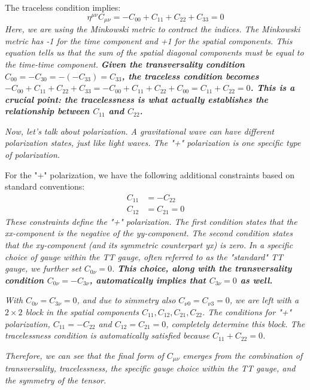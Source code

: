 The traceless condition implies:
\begin{equation}
\eta^{\mu \nu} C_{\mu \nu} = -C_{00} + C_{11} + C_{22} + C_{33} = 0
\end{equation}
\emph{Here, we are using the Minkowski metric to contract the indices. The Minkowski metric has -1 for the time component and +1 for the spatial components. This equation tells us that the sum of the spatial diagonal components must be equal to the time-time component.} \emph{\textbf{Given the transversality condition $C_{00} = -C_{30} = -(-C_{33}) = C_{33}$, the traceless condition becomes $-C_{00} + C_{11} + C_{22} + C_{33} = -C_{00}+C_{11}+C_{22}+C_{00} = C_{11} + C_{22} = 0$. This is a crucial point: the tracelessness is what actually establishes the relationship between $C_{11}$ and $C_{22}$.}}

\emph{Now, let's talk about polarization. A gravitational wave can have different polarization states, just like light waves. The "+" polarization is one specific type of polarization.}

For the "+" polarization, we have the following additional constraints based on standard conventions:
\begin{align}
C_{11} &= -C_{22} \\
C_{12} &= C_{21} = 0
\end{align}
\emph{These constraints define the "+" polarization. The first condition states that the xx-component is the negative of the yy-component. The second condition states that the xy-component (and its symmetric counterpart yx) is zero.} \emph{In a specific choice of gauge within the TT gauge, often referred to as the "standard" TT gauge, we further set $C_{0\nu} = 0$. \textbf{This choice, along with the transversality condition $C_{0\nu} = -C_{3\nu}$, automatically implies that $C_{3\nu} = 0$ as well.}}

\emph{With $C_{0\nu} = C_{3\nu} = 0$, and due to simmetry also $C_{\nu0} = C_{\nu3} = 0$, we are left with a $2\times2$ block in the spatial components $C_{11}, C_{12}, C_{21}, C_{22}$. The conditions for "+" polarization, $C_{11} = -C_{22}$ and $C_{12} = C_{21} = 0$, completely determine this block. The tracelessness condition is automatically satisfied because $C_{11} + C_{22} = 0$.}

\emph{Therefore, we can see that the final form of $C_{\mu\nu}$ emerges from the combination of transversality, tracelessness, the specific gauge choice within the TT gauge, and the symmetry of the tensor.}

